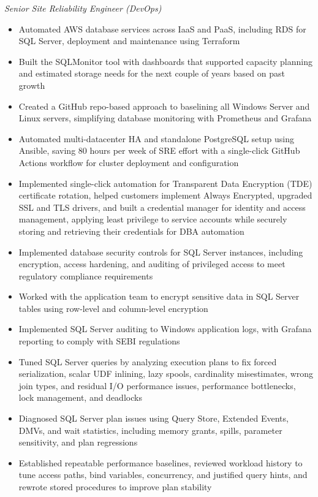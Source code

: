 \documentclass[10pt,a4paper]{article}
\begin{document}
\textit{Senior Site Reliability Engineer (DevOps)}\\[-5pt]
\begin{itemize}
  \item Automated AWS database services across IaaS and PaaS, including RDS for SQL Server, deployment and maintenance using Terraform
  \item Built the SQLMonitor tool with dashboards that supported capacity planning and estimated storage needs for the next couple of years based on past growth
  \item Created a GitHub repo-based approach to baselining all Windows Server and Linux servers, simplifying database monitoring with Prometheus and Grafana
  \item Automated multi-datacenter HA and standalone PostgreSQL setup using Ansible, saving 80 hours per week of SRE effort with a single-click GitHub Actions workflow for cluster deployment and configuration
  \item Implemented single-click automation for Transparent Data Encryption (TDE) certificate rotation, helped customers implement Always Encrypted, upgraded SSL and TLS drivers, and built a credential manager for identity and access management, applying least privilege to service accounts while securely storing and retrieving their credentials for DBA automation
  \item Implemented database security controls for SQL Server instances, including encryption, access hardening, and auditing of privileged access to meet regulatory compliance requirements
  \item Worked with the application team to encrypt sensitive data in SQL Server tables using row-level and column-level encryption
  \item Implemented SQL Server auditing to Windows application logs, with Grafana reporting to comply with SEBI regulations
  \item Tuned SQL Server queries by analyzing execution plans to fix forced serialization, scalar UDF inlining, lazy spools, cardinality misestimates, wrong join types, and residual I/O performance issues, performance bottlenecks, lock management, and deadlocks
  \item Diagnosed SQL Server plan issues using Query Store, Extended Events, DMVs, and wait statistics, including memory grants, spills, parameter sensitivity, and plan regressions
  \item Established repeatable performance baselines, reviewed workload history to tune access paths, bind variables, concurrency, and justified query hints, and rewrote stored procedures to improve plan stability

\end{itemize}
\end{document}
